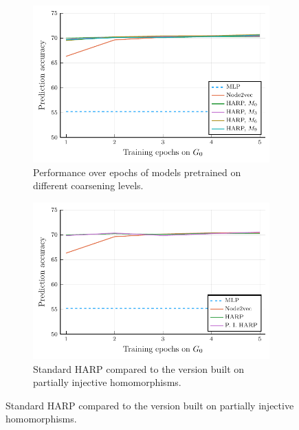 \begin{figure}
  \centering
  \begin{subfigure}[t]{0.49\textwidth}
    \centering
    \includegraphics[width=\textwidth]{images/steps_accur/steps_accur.pdf}
    \caption{Performance over epochs of models pretrained on different coarsening levels.}\label{fig:steps-accuracy}
  \end{subfigure}
  \begin{subfigure}[t]{0.49\textwidth}
    \centering
    \includegraphics[width=\textwidth]{images/pihom_comparison/pihom_comparison.pdf}
    \caption{Standard HARP compared to the version built on partially injective homomorphisms.}\label{fig:HARP-vs-PIHom}
  \end{subfigure}
\end{figure}

